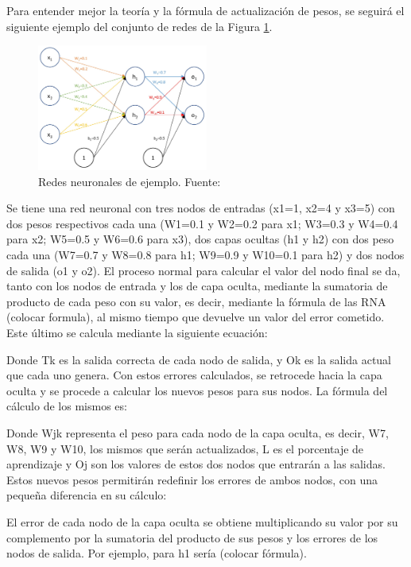 \begin{itemize}
\begin{itemize}
\begin{itemize}
			Para entender mejor la teoría y la fórmula de actualización de pesos, se seguirá el siguiente ejemplo del conjunto de redes de la Figura \ref{2:fig17}.
			\begin{figure}[h]
				\begin{center}
					\includegraphics[width=0.5\textwidth]{2/figures/rna_pesos.jpg}
					\caption{Redes neuronales de ejemplo. Fuente: \cite{gl_ansrw2019backpropagation}}
					\label{2:fig17}
				\end{center}
			\end{figure}
			
			Se tiene una red neuronal con tres nodos de entradas (x1=1, x2=4 y x3=5) con dos pesos respectivos cada una (W1=0.1 y W2=0.2 para x1; W3=0.3 y W4=0.4 para x2; W5=0.5 y W6=0.6 para x3), dos capas ocultas (h1 y h2) con dos peso cada una (W7=0.7 y W8=0.8 para h1; W9=0.9 y W10=0.1 para h2) y dos nodos de salida (o1 y o2). El proceso normal para calcular el valor del nodo final se da, tanto con los nodos de entrada y los de capa oculta, mediante la sumatoria de producto de cada peso con su valor, es decir, mediante la fórmula de las RNA (colocar formula), al mismo tiempo que devuelve un valor del error cometido. Este último se calcula mediante la siguiente ecuación:
			
			Donde Tk es la salida correcta de cada nodo de salida, y Ok es la salida actual que cada uno genera. Con estos errores calculados, se retrocede hacia la capa oculta y se procede a calcular los nuevos pesos para sus nodos. La fórmula del cálculo de los mismos es:
			
			Donde Wjk representa el peso para cada nodo de la capa oculta, es decir, W7, W8, W9 y W10, los mismos que serán actualizados, L es el porcentaje de aprendizaje y Oj son los valores de estos dos nodos que entrarán a las salidas. Estos nuevos pesos permitirán redefinir los errores de ambos nodos, con una pequeña diferencia en su cálculo:
			
			El error de cada nodo de la capa oculta se obtiene multiplicando su valor por su complemento por la sumatoria del producto de sus pesos y los errores de los nodos de salida. Por ejemplo, para h1 sería (colocar fórmula).
			

\end{itemize}
\end{itemize}
\end{itemize}
